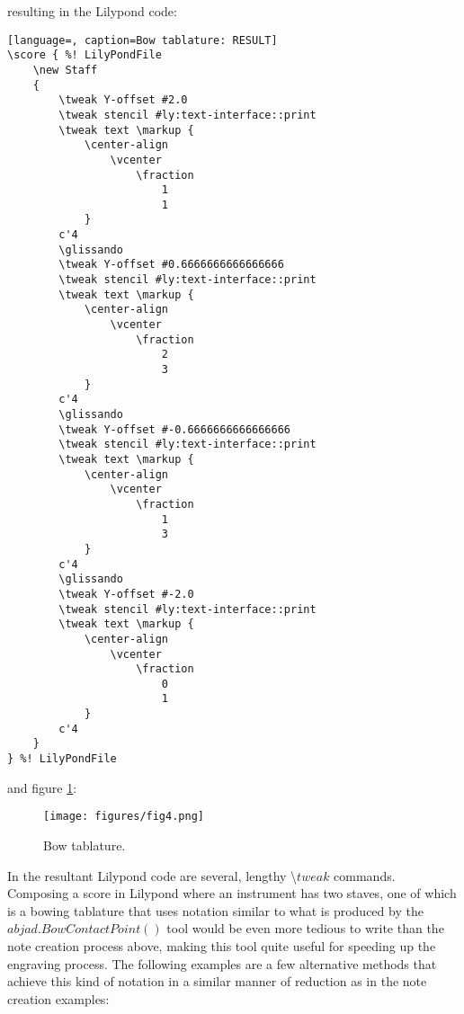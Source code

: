 resulting in the Lilypond code:

\singlespace
\begin{lstlisting}[language=, caption=Bow tablature: RESULT]
\score { %! LilyPondFile
    \new Staff
    {
        \tweak Y-offset #2.0
        \tweak stencil #ly:text-interface::print
        \tweak text \markup {
            \center-align
                \vcenter
                    \fraction
                        1
                        1
            }
        c'4
        \glissando
        \tweak Y-offset #0.6666666666666666
        \tweak stencil #ly:text-interface::print
        \tweak text \markup {
            \center-align
                \vcenter
                    \fraction
                        2
                        3
            }
        c'4
        \glissando
        \tweak Y-offset #-0.6666666666666666
        \tweak stencil #ly:text-interface::print
        \tweak text \markup {
            \center-align
                \vcenter
                    \fraction
                        1
                        3
            }
        c'4
        \glissando
        \tweak Y-offset #-2.0
        \tweak stencil #ly:text-interface::print
        \tweak text \markup {
            \center-align
                \vcenter
                    \fraction
                        0
                        1
            }
        c'4
    }
} %! LilyPondFile
\end{lstlisting}
\doublespace

and figure \ref{fig:bow_contact_1}:

\singlespace
\begin{figure}[h]
  \texttt{[image: figures/fig4.png]}
  \caption{Bow tablature.}
  \label{fig:bow_contact_1}
\end{figure}
\doublespace

In the resultant Lilypond code are several, lengthy \textbackslash$tweak$ commands. Composing a score in Lilypond where an instrument has two staves, one of which is a bowing tablature that uses notation similar to what is produced by the $abjad.BowContactPoint()$ tool would be even more tedious to write than the note creation process above, making this tool quite useful for speeding up the engraving process. The following examples are a few alternative methods that achieve this kind of notation in a similar manner of reduction as in the note creation examples:

